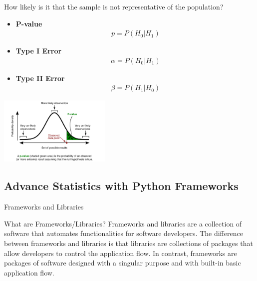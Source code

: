 \documentclass{beamer}
\begin{document}
    \begin{frame}{How likely is it that the sample is not representative of the population?}
        \begin{itemize}
            \item \textbf{P-value}
            \begin{align*}
                p = P(H_{0}|H_{1})
            \end{align*}
            \item \textbf{Type I Error}
            \begin{align*}
                \alpha = P(H_{0}|H_{1})
            \end{align*}
            \item \textbf{Type II Error}
            \begin{align*}
                \beta = P(H_{1}|H_{0})
            \end{align*}
        \end{itemize}
        \begin{center}
            \includegraphics[width=0.4\textwidth]{figures/P-value.png}
        \end{center}
    \end{frame}

    \subsection{Advance Statistics with Python Frameworks}
    \begin{frame}[fragile]{Frameworks and Libraries}
        \begin{block}{What are Frameworks/Libraries?}
            Frameworks and libraries are a collection of software that automates functionalities for software developers. The difference between frameworks and libraries is that libraries are collections of packages that allow developers to control the application flow. In contrast, frameworks are packages of software designed with a singular purpose and with built-in basic application flow.
        \end{block}
    \end{frame}
\end{document}
